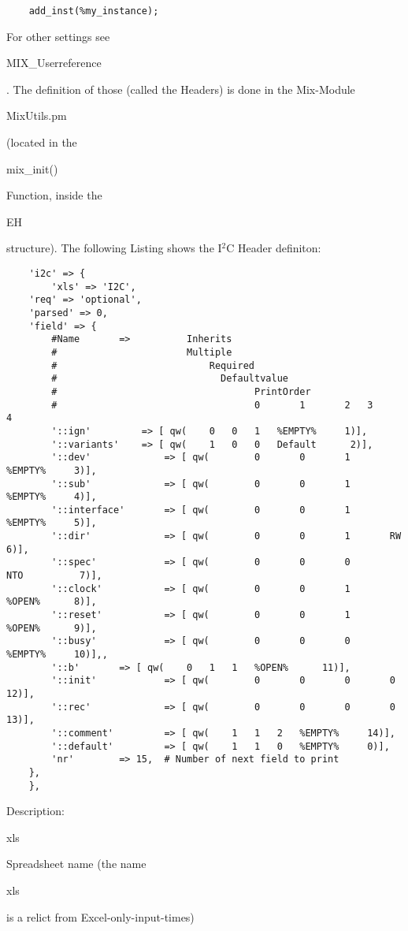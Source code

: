 \documentclass[a4paper,12pt]{article}
\begin{document}
\begin{tt}
\begin{verbatim}
    add_inst(%my_instance);
\end{verbatim}
For other settings see \begin{tt}MIX\_Userreference\end{tt}. The definition of those (called the Headers) is done in the Mix-Module \begin{tt}MixUtils.pm\end{tt} (located in the \begin{tt}mix\_init()\end{tt} Function, inside the \begin{tt}EH\end{tt} structure). The following Listing shows the I$^2$C Header definiton:\newline
\begin{verbatim}
    'i2c' => {
        'xls' => 'I2C',
	'req' => 'optional',
	'parsed' => 0,
	'field' => {
	    #Name   	=>	  	    Inherits
	    #					    Multiple
	    #						    Required
	    #							  Defaultvalue
	    #								    PrintOrder
	    #                                   0       1       2	3       4
	    '::ign' 		=> [ qw(	0	0	1	%EMPTY%     1)],
	    '::variants'	=> [ qw(	1	0	0	Default	     2)],
	    '::dev'             => [ qw(        0       0       1       %EMPTY%     3)],
	    '::sub'             => [ qw(        0       0       1       %EMPTY%     4)],
	    '::interface'       => [ qw(        0       0       1       %EMPTY%     5)],
	    '::dir'             => [ qw(        0       0       1       RW           6)],
	    '::spec'            => [ qw(        0       0       0       NTO          7)],
	    '::clock'           => [ qw(        0       0       1       %OPEN%      8)],
	    '::reset'           => [ qw(        0       0       1       %OPEN%      9)],
	    '::busy'            => [ qw(        0       0       0       %EMPTY%     10)],,
	    '::b'		=> [ qw(	0	1	1	%OPEN%      11)],
	    '::init'            => [ qw(        0       0       0       0            12)],
	    '::rec'             => [ qw(        0       0       0       0            13)],
	    '::comment'	        => [ qw(	1	1	2	%EMPTY%     14)],
	    '::default'	        => [ qw(	1	1	0	%EMPTY%     0)],
	    'nr'		=> 15,  # Number of next field to print
	},
    },
\end{verbatim}
Description: \begin{tt}xls\end{tt} Spreadsheet name (the name \begin{tt}xls\end{tt} is a relict from Excel-only-input-times)\newline

\end{tt}
\end{document}
